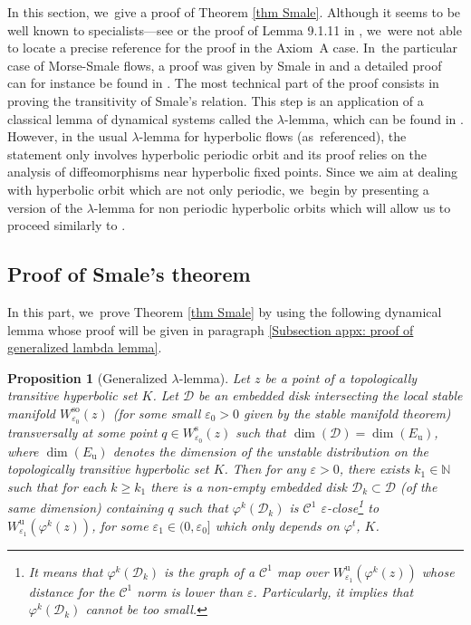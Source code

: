 \documentclass[JEP,XML,SOM,Unicode,NoEqCountersInSection,NoFloatCountersInSection,published]{cedram}
\newcommand{\rs}{\mathrm{s}}
\newcommand{\rso}{\mathrm{so}}
\newcommand{\ru}{\mathrm{u}}
\theoremstyle{definition}
\theoremstyle{plain}
\newtheorem{prop}[definition]{Proposition}
\newcommand{\Ccal}{\mathcal{C}}
\newcommand{\D}{\mathcal{D}}
\newcommand{\N}{\mathbb{N}}
\begin{document}
\begin{appendix}
\label{Appendix: proof of Smale ordering}
In this section, we~give a proof of Theorem \ref{thm Smale}. Although it seems to be well known to specialists---see \cite[p.\,158]{robinson} or the proof of Lemma 9.1.11 in \cite[p.\,536]{FH}, we~were not able to locate a precise reference for the proof in the Axiom~A case. In~the particular case of Morse-Smale flows, a proof was given by Smale in \cite{smale-morse} and a detailed proof can for instance be found in \cite[App.\,B]{DRI}. The most technical part of the proof consists in proving the transitivity of Smale's relation. This step is an application of a classical lemma of dynamical systems called the $\lambda$-lemma, which can be found in \cite[Prop.\,6.1.10, p.\,335]{FH}. However, in the usual $\lambda$-lemma for hyperbolic flows (as~referenced), the statement only involves hyperbolic periodic orbit and its proof relies on the analysis of diffeomorphisms near hyperbolic fixed points. Since we aim at dealing with hyperbolic orbit which are not only periodic, we~begin by presenting a version of the $\lambda$-lemma for non periodic hyperbolic orbits which will allow us to proceed similarly to \cite[App.\,B]{DRI}.

\subsection{Proof of Smale's theorem}

In this part, we~prove Theorem \ref{thm Smale} by using the following dynamical lemma whose proof will be given in paragraph \ref{Subsection appx: proof of generalized lambda lemma}.

\begin{prop}[Generalized $\lambda$-lemma]\label{Prop: lambda lemma for non periodic orbit} Let $z$ be a point of a topologically transitive hyperbolic set $K$. Let $\D$ be an embedded disk intersecting the local stable manifold $W_{\varepsilon_0}^{\rso} (z)$ (for some small $\varepsilon_0 > 0$ given by the stable manifold theorem) transversally at some point $q \in W_{\varepsilon_0}^\rs (z)$ such that $\dim (\D) = \dim(E_\ru)$, where $\dim (E_\ru)$ denotes the dimension of the unstable distribution on the topologically transitive hyperbolic set $K$. Then for any $\varepsilon > 0$, there exists $k_1 \in \N$ such that
for each $k \geq k_1$ there is a non-empty embedded disk $\D_k \subset \D$ (of the same dimension) containing $q$ such that $\varphi^k (\D_k)$ is $\Ccal^1$ $\varepsilon$-close\footnote{It means that $\varphi^k (\D_k)$ is the graph of a $\Ccal^1$ map over $W_{\varepsilon_1}^{\ru} (\varphi^k(z))$ whose distance for the $\Ccal^1$ norm is lower than $\varepsilon$. Particularly, it implies that $\varphi^k (\D_k)$ cannot be too small.} to $W_{\varepsilon_1}^{\ru} (\varphi^k(z))$, for some $\varepsilon_1\in(0,\varepsilon_0]$ which only depends on $\varphi^t$, $K$.
\end{prop}


\end{appendix}
\end{document}
